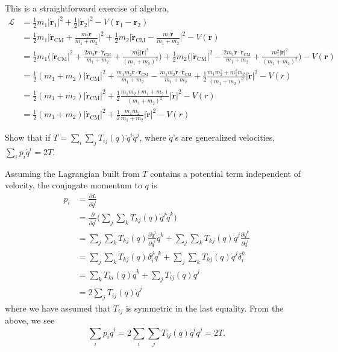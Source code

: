 \documentclass[../principles-of-quantum-mechanics.tex]{subfiles}
\begin{document}
\begin{questions}
		\begin{solution}
			This is a straightforward exercise of algebra,
			\begin{align*}
			\mathcal{L} &= \frac{1}{2}m_1|\dot{\mathbf{r}}_1|^2 + \frac{1}{2}|\dot{\mathbf{r}}_2|^2 - V(\mathbf{r}_1 - \mathbf{r}_2) \\
			&= \frac{1}{2}m_1\Big|\dot{\mathbf{r}}_{\mathrm{CM}} + \frac{m_2\dot{\mathbf{r}}}{m_1+m_2}\Big|^2 + \frac{1}{2}m_2\Big|\dot{\mathbf{r}}_{\mathrm{CM}} - \frac{m_1\dot{\mathbf{r}}}{m_1+m_2}\Big|^2 - V(\mathbf{r}) \\
			&= \frac{1}{2}m_1\Big(|\dot{\mathbf{r}}_{\mathrm{CM}}|^2 + \frac{2m_2\dot{\mathbf{r}}\cdot\dot{\mathbf{r}}_{\mathrm{CM}}}{m_1+m_2} + \frac{m_2^2|\dot{\mathbf{r}}|^2}{(m_1+m_2)^2}\Big) +  \frac{1}{2}m_2\Big(|\dot{\mathbf{r}}_{\mathrm{CM}}|^2 - \frac{2m_1\dot{\mathbf{r}}\cdot\dot{\mathbf{r}}_{\mathrm{CM}}}{m_1+m_2} + \frac{m_1^2|\dot{\mathbf{r}}|^2}{(m_1+m_2)^2}\Big) - V(\mathbf{r}) \\
			&= \frac{1}{2}(m_1+m_2)|\dot{\mathbf{r}}_{\mathrm{CM}}|^2 + \frac{m_1m_2\dot{\mathbf{r}}\cdot\dot{\mathbf{r}}_{\mathrm{CM}}}{m_1+m_2} - \frac{m_1m_2\dot{\mathbf{r}}\cdot\dot{\mathbf{r}}_{\mathrm{CM}}}{m_1+m_2} + \frac{1}{2}\frac{m_1m_2^2 + m_1^2m_2}{(m_1+m_2)^2}|\dot{\mathbf{r}}|^2 - V(r) \\
			&= \frac{1}{2}(m_1+m_2)|\dot{\mathbf{r}}_{\mathrm{CM}}|^2 + \frac{1}{2}\frac{m_1m_2(m_1 + m_2)}{(m_1+m_2)^2}|\dot{\mathbf{r}}|^2 - V(r) \\
			&= \frac{1}{2}(m_1+m_2)|\dot{\mathbf{r}}_{\mathrm{CM}}|^2 + \frac{1}{2}\frac{m_1m_2}{m_1+m_2}|\dot{\mathbf{r}}|^2 - V(r)
			\end{align*}
		\end{solution}
	
		\question Show that if $T = \sum_i\sum_j{T_{ij}}(q)\dot{q}^i\dot{q}^j$, where $\dot{q}$'s are generalized velocities, $\sum_ip_i\dot{q}^i=2T$.
		
		\begin{solution}
			Assuming the Lagrangian built from $T$ contains a potential term independent of velocity, the conjugate momentum to $q$ is
			\begin{align*}
				p_i &= \frac{\partial{L}}{\partial{\dot{q}^i}} \\
				&= \frac{\partial}{\partial{\dot{q}^i}}\Big(\sum_j\sum_kT_{kj}(q)\dot{q}^j\dot{q}^k\Big) \\
				&= \sum_j\sum_kT_{kj}(q)\frac{\partial{\dot{q}^j}}{\partial{\dot{q}^i}}\dot{q}^k + \sum_j\sum_kT_{kj}(q)\dot{q}^j\frac{\partial{\dot{q}^k}}{\partial{\dot{q}^i}} \\
				&= \sum_j\sum_kT_{kj}(q)\delta^j_i\dot{q}^k + \sum_j\sum_kT_{kj}(q)\dot{q}^j\delta^k_i \\
				&= \sum_kT_{ki}(q)\dot{q}^k + \sum_jT_{ij}(q)\dot{q}^j \\
				&= 2\sum_jT_{ij}(q)\dot{q}^j
			\end{align*}
			where we have assumed that $T_{ij}$ is symmetric in the last equality. From the above, we see
			\[
				\sum_ip_i\dot{q}^i = 2\sum_i\sum_jT_{ij}(q)\dot{q}^i\dot{q}^j = 2T.
			\]
		\end{solution}
	

\end{questions}
\end{document}
